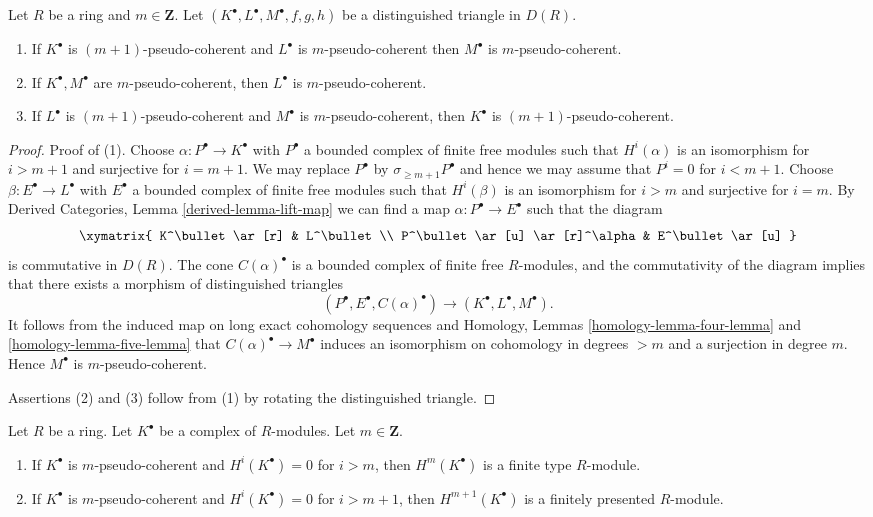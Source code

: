 \begin{lemma}
\label{lemma-cone-pseudo-coherent}
Let $R$ be a ring and $m \in \mathbf{Z}$.
Let $(K^\bullet, L^\bullet, M^\bullet, f, g, h)$ be a distinguished
triangle in $D(R)$.
\begin{enumerate}
\item If $K^\bullet$ is $(m + 1)$-pseudo-coherent and
$L^\bullet$ is $m$-pseudo-coherent then $M^\bullet$ is
$m$-pseudo-coherent.
\item If $K^\bullet, M^\bullet$ are $m$-pseudo-coherent, then
$L^\bullet$ is $m$-pseudo-coherent.
\item If $L^\bullet$ is $(m + 1)$-pseudo-coherent and $M^\bullet$
is $m$-pseudo-coherent, then $K^\bullet$ is $(m + 1)$-pseudo-coherent.
\end{enumerate}
\end{lemma}

\begin{proof}
Proof of (1). Choose $\alpha : P^\bullet \to K^\bullet$
with $P^\bullet$ a bounded complex of finite free modules
such that $H^i(\alpha)$ is an isomorphism for $i > m + 1$ and
surjective for $i = m + 1$. We may replace $P^\bullet$ by
$\sigma_{\geq m + 1}P^\bullet$ and hence we may assume that $P^i = 0$
for $i < m + 1$. Choose $\beta : E^\bullet \to L^\bullet$ with $E^\bullet$
a bounded complex of finite free modules such that
$H^i(\beta)$ is an isomorphism for $i > m$ and
surjective for $i = m$. By
Derived Categories,
Lemma \ref{derived-lemma-lift-map}
we can find a map $\alpha : P^\bullet \to E^\bullet$ such that the diagram
$$
\xymatrix{
K^\bullet \ar[r] & L^\bullet \\
P^\bullet \ar[u] \ar[r]^\alpha & E^\bullet \ar[u]
}
$$
is commutative in $D(R)$. The cone $C(\alpha)^\bullet$ is a bounded
complex of finite free $R$-modules, and the commutativity of the
diagram implies that there exists a morphism of distinguished triangles
$$
(P^\bullet, E^\bullet, C(\alpha)^\bullet)
\longrightarrow
(K^\bullet, L^\bullet, M^\bullet).
$$
It follows from the induced map on long exact cohomology sequences and
Homology, Lemmas \ref{homology-lemma-four-lemma} and
\ref{homology-lemma-five-lemma}
that $C(\alpha)^\bullet \to M^\bullet$ induces an isomorphism
on cohomology in degrees $> m$ and a surjection in degree $m$.
Hence $M^\bullet$ is $m$-pseudo-coherent.

\medskip\noindent
Assertions (2) and (3) follow from (1) by rotating the distinguished
triangle.
\end{proof}

\begin{lemma}
\label{lemma-finite-cohomology}
Let $R$ be a ring. Let $K^\bullet$ be a complex of $R$-modules.
Let $m \in \mathbf{Z}$.
\begin{enumerate}
\item If $K^\bullet$ is $m$-pseudo-coherent and $H^i(K^\bullet) = 0$
for $i > m$, then $H^m(K^\bullet)$ is a finite type $R$-module.
\item If $K^\bullet$ is $m$-pseudo-coherent and $H^i(K^\bullet) = 0$
for $i > m + 1$, then $H^{m + 1}(K^\bullet)$ is a finitely presented
$R$-module.
\end{enumerate}
\end{lemma}

